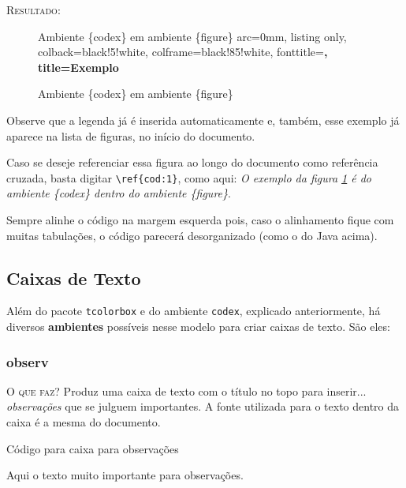 \textsc{Resultado:}

\begin{figure}[h!]
\begin{codex}{Ambiente \{codex\} em ambiente \{figure\}}
arc=0mm,
listing only,
colback=black!5!white,
colframe=black!85!white,
fonttitle=\bfseries,
title=Exemplo
\end{codex}
\caption{Ambiente \{codex\} em ambiente \{figure\}}
\label{cod:1}
\end{figure}

Observe que a legenda já é inserida automaticamente e, também, esse exemplo já aparece na lista de figuras, no início do documento.

Caso se deseje referenciar essa figura ao longo do documento como referência cruzada, basta digitar \verb|\ref{cod:1}|, como aqui: \textit{O exemplo da figura \ref{cod:1} é do ambiente \{codex\} dentro do ambiente \{figure\}}.


Sempre alinhe o código na margem esquerda pois, caso o alinhamento fique com muitas tabulações, o código parecerá desorganizado (como o do Java acima).

\subsection{Caixas de Texto}

Além do pacote \verb|tcolorbox| e do ambiente \verb|codex|, explicado anteriormente, há diversos \textbf{ambientes} possíveis nesse modelo para criar caixas de texto. São eles:

\subsubsection{observ}

\textsc{O que faz?} Produz uma caixa de texto com o título  no topo para inserir... \textit{observações} que se julguem importantes. A fonte utilizada para o texto dentro da caixa é a mesma do documento.
\ \\

\begin{codex}{Código para caixa para observações}
	\begin{observ}
	Aqui o texto muito importante para observações.
	\end{observ}
\end{codex}
\ \\

